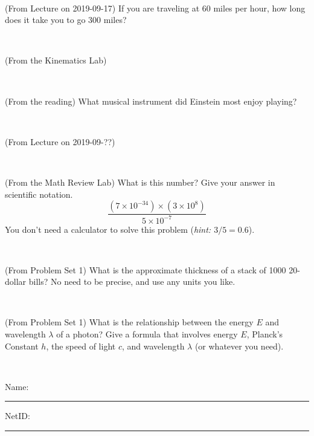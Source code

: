 \documentclass[12pt, letterpaper]{article}
\begin{document}
\vfill ~

\begin{problem} (From Lecture on 2019-09-17)
If you are traveling at 60 miles per hour, how long does
it take you to go 300 miles?
\end{problem}


\vfill ~

\begin{problem} (From the Kinematics Lab)

\end{problem}


\vfill ~

\begin{problem} (From the reading)
What musical instrument did Einstein most enjoy playing?
\end{problem}


\vfill ~


\clearpage


\begin{problem} (From Lecture on 2019-09-??)
\end{problem}


\vfill ~

\begin{problem} (From the Math Review Lab)
What is this number? Give your answer in scientific notation.
$$
\frac{(7\times10^{-34})\times(3\times10^8)}{5\times10^{-7}}
$$
You don't need a calculator to solve this problem (\textit{hint: $3/5=0.6$}).
\end{problem}


\vfill ~

\begin{problem} (From Problem Set 1)
What is the approximate thickness of a stack of 1000 20-dollar bills?
No need to be precise, and use any units you like.
\end{problem}


\vfill ~

\begin{problem} (From Problem Set 1)
What is the relationship between the energy $E$ and wavelength
$\lambda$ of a photon? Give a formula that involves energy $E$,
Planck's Constant $h$, the speed of light $c$, and wavelength
$\lambda$ (or whatever you need).
\end{problem}

\vfill ~


\cleardoublepage



\noindent
Name: \rule[-1ex]{0.60\textwidth}{0.1pt}
NetID: \rule[-1ex]{0.20\textwidth}{0.1pt}
\end{document}
